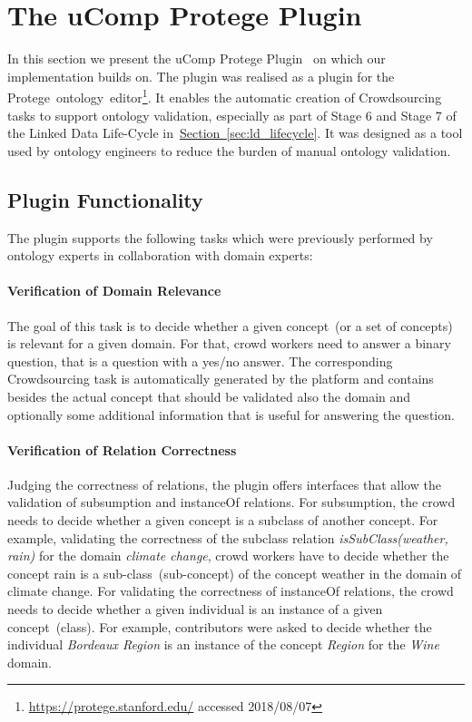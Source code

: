 
\section{The uComp Protege Plugin}\label{sec:ucomp_protege_plugin}
In this section we present the uComp Protege Plugin~\cite{wohlgenannt2016} on which our implementation builds on. The plugin was realised as a plugin for the Protege~ontology~editor\footnote{\url{https://protege.stanford.edu/} accessed 2018/08/07}. It enables the automatic creation of Crowdsourcing tasks to support ontology validation, especially as part of Stage 6 and Stage 7 of the Linked Data Life-Cycle in~\hyperref[sec:ld_lifecycle]{Section~\ref*{sec:ld_lifecycle}}. It was designed as a tool used by ontology engineers to reduce the burden of manual ontology validation.

\subsection{Plugin Functionality}\label{sec:ucomp_protege_plugin_functionality}
The plugin supports the following tasks which were previously performed by ontology experts in collaboration with domain experts:

\paragraph{Verification of Domain Relevance}
The goal of this task is to decide whether a given concept~(or a set of concepts) is relevant for a given domain. For that, crowd workers need to
answer a binary question, that is a question with a yes/no answer. The corresponding Crowdsourcing task is automatically generated by the platform and
contains besides the actual concept that should be validated also the domain and optionally some additional information that is useful for answering 
the question. 

\paragraph{Verification of Relation Correctness}
Judging the correctness of relations, the plugin offers interfaces that allow the validation of subsumption and instanceOf relations. 
For subsumption, the crowd needs to decide whether a given concept is a subclass of another concept. For example, validating the correctness
of the subclass relation \emph{isSubClass(weather, rain)} for the domain \emph{climate change}, crowd workers have to decide whether the concept rain is a sub-class~(sub-concept) of the concept weather in the domain of climate change. For validating the correctness of instanceOf relations, the crowd needs to decide whether a given individual is an instance of a given concept~(class). For example, contributors were asked to decide whether the individual \emph{Bordeaux Region} is an instance of the concept \emph{Region} for the \emph{Wine} domain. 

